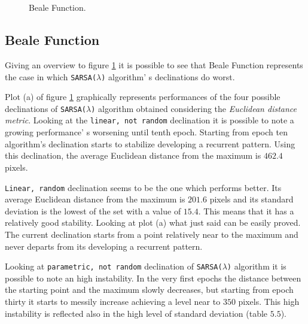 \begin{figure}[h!]
	\begin{center}
		\\
		 \\
		
	\end{center}
	\caption{
		Beale Function.
	}
	\label{fig:BealeResults}
\end{figure}

\subsection{Beale Function} Giving an overview to figure \ref{fig:BealeResults} it is possible to see that Beale Function represents the case in which {\tt SARSA($\lambda$)} algorithm' s declinations do worst. 

Plot (a) of figure \ref{fig:BealeResults} graphically represents performances of the four possible declinations of {\tt SARSA($\lambda$)} algorithm obtained considering the \textit{Euclidean distance metric}. Looking at the {\tt linear, not random} declination it is possible to note a growing performance' s worsening until tenth epoch. Starting from epoch ten algorithm's declination starts to stabilize developing a recurrent pattern. Using this declination, the average Euclidean distance from the maximum is $462.4$ pixels.

{\tt Linear, random} declination seems to be the one which performs better. Its average Euclidean distance from the maximum is $201.6$ pixels and its standard deviation is the lowest of the set with a value of $15.4$. This means that it has a relatively good stability. Looking at plot (a) what just said can be easily proved. The current declination starts from a point relatively near to the maximum and never departs from its developing a recurrent pattern.

Looking at {\tt parametric, not random} declination of  {\tt SARSA($\lambda$)} algorithm it is possible to note an high instability. In the very first epochs the distance between the starting point and the maximum slowly decreases, but starting from epoch thirty it starts to messily increase achieving a level near to $350$ pixels. This high instability is reflected also in the high level of standard deviation (table $5.5$).

